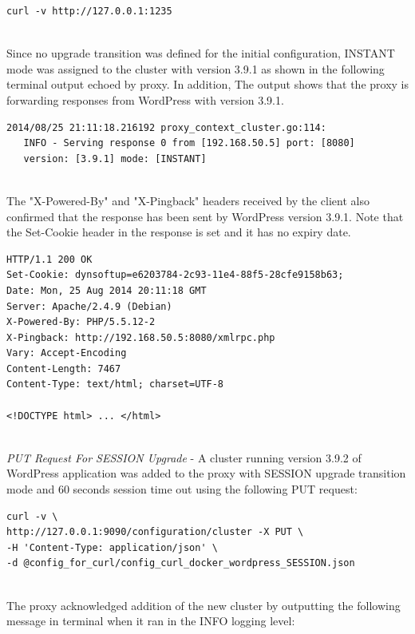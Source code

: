 \documentclass[a4paper,11pt,twoside]{report}
\begin{document}
\begin{lstlisting}[language=terminal]
curl -v http://127.0.0.1:1235
\end{lstlisting} 

\noindent\\Since no upgrade transition was defined for the initial configuration, INSTANT mode was assigned to the cluster with version 3.9.1 as shown in the following terminal output echoed by proxy. In addition, The output shows that the proxy is forwarding responses from WordPress with version 3.9.1. \smallskip

\begin{lstlisting}[language=terminal] 
2014/08/25 21:11:18.216192 proxy_context_cluster.go:114:     
   INFO - Serving response 0 from [192.168.50.5] port: [8080] 
   version: [3.9.1] mode: [INSTANT]
\end{lstlisting} 

\noindent\\
The "X-Powered-By" and "X-Pingback" headers received by the client also confirmed that the response has been sent by WordPress version 3.9.1.  Note that the Set-Cookie header in the response is set and it has no expiry date. \smallskip 

\begin{lstlisting}[language=terminal] 
HTTP/1.1 200 OK
Set-Cookie: dynsoftup=e6203784-2c93-11e4-88f5-28cfe9158b63;
Date: Mon, 25 Aug 2014 20:11:18 GMT
Server: Apache/2.4.9 (Debian)
X-Powered-By: PHP/5.5.12-2
X-Pingback: http://192.168.50.5:8080/xmlrpc.php
Vary: Accept-Encoding
Content-Length: 7467
Content-Type: text/html; charset=UTF-8

<!DOCTYPE html> ... </html>
\end{lstlisting} 

\noindent\\
\textit{PUT Request For SESSION Upgrade} - A cluster running version 3.9.2 of WordPress application was added to the proxy with SESSION upgrade transition mode and 60 seconds session time out using the following PUT request: \smallskip 

\begin{lstlisting}[language=terminal] 
curl -v \
http://127.0.0.1:9090/configuration/cluster -X PUT \
-H 'Content-Type: application/json' \ 
-d @config_for_curl/config_curl_docker_wordpress_SESSION.json
\end{lstlisting}

\noindent\\
The proxy acknowledged addition of the new cluster by outputting the following message in terminal when it ran in the INFO logging level: \smallskip 
\end{document}
